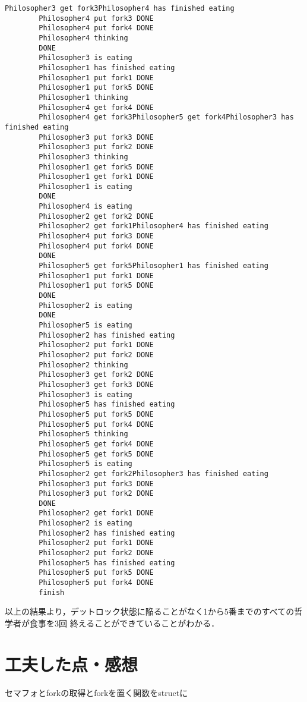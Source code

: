 \documentclass[a4paper,dvipdfmx]{jsarticle}
\begin{document}
\begin{lstlisting}[caption=実行結果,label=run_res]
        Philosopher3 get fork3Philosopher4 has finished eating
        Philosopher4 put fork3 DONE 
        Philosopher4 put fork4 DONE 
        Philosopher4 thinking
        DONE 
        Philosopher3 is eating
        Philosopher1 has finished eating
        Philosopher1 put fork1 DONE 
        Philosopher1 put fork5 DONE 
        Philosopher1 thinking
        Philosopher4 get fork4 DONE 
        Philosopher4 get fork3Philosopher5 get fork4Philosopher3 has finished eating
        Philosopher3 put fork3 DONE 
        Philosopher3 put fork2 DONE 
        Philosopher3 thinking
        Philosopher1 get fork5 DONE 
        Philosopher1 get fork1 DONE 
        Philosopher1 is eating
        DONE 
        Philosopher4 is eating
        Philosopher2 get fork2 DONE 
        Philosopher2 get fork1Philosopher4 has finished eating
        Philosopher4 put fork3 DONE 
        Philosopher4 put fork4 DONE 
        DONE 
        Philosopher5 get fork5Philosopher1 has finished eating
        Philosopher1 put fork1 DONE 
        Philosopher1 put fork5 DONE 
        DONE 
        Philosopher2 is eating
        DONE 
        Philosopher5 is eating
        Philosopher2 has finished eating
        Philosopher2 put fork1 DONE 
        Philosopher2 put fork2 DONE 
        Philosopher2 thinking
        Philosopher3 get fork2 DONE 
        Philosopher3 get fork3 DONE 
        Philosopher3 is eating
        Philosopher5 has finished eating
        Philosopher5 put fork5 DONE 
        Philosopher5 put fork4 DONE 
        Philosopher5 thinking
        Philosopher5 get fork4 DONE 
        Philosopher5 get fork5 DONE 
        Philosopher5 is eating
        Philosopher2 get fork2Philosopher3 has finished eating
        Philosopher3 put fork3 DONE 
        Philosopher3 put fork2 DONE 
        DONE 
        Philosopher2 get fork1 DONE 
        Philosopher2 is eating
        Philosopher2 has finished eating
        Philosopher2 put fork1 DONE 
        Philosopher2 put fork2 DONE 
        Philosopher5 has finished eating
        Philosopher5 put fork5 DONE 
        Philosopher5 put fork4 DONE 
        finish
    \end{lstlisting}\par
    以上の結果より，デットロック状態に陥ることがなく1から5番までのすべての哲学者が食事を3回
    終えることができていることがわかる．

\section{工夫した点・感想}
    セマフォとforkの取得とforkを置く関数をstructに
\end{document}
